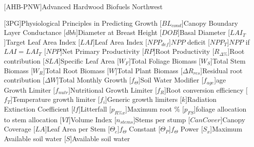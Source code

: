 \usepackage[printonlyused]{acronym}
[AHB-PNW]{Advanced Hardwood Biofuels Northwest}

[\textsc{3PG}]{Physiological Principles in Predicting Growth}
[\ensuremath{BL_{cond}}]{Canopy Boundary Layer Conductance}
[\ensuremath{dbh}]{Diameter at Breast Height}
[\ensuremath{DOB}]{Basal Diameter}
[\ensuremath{LAI_{T}}]{Target Leaf Area Index}
[\ensuremath{LAI}]{Leaf Area Index}
[\ensuremath{NPP_{def}}]{$NPP$ deficit}
[\ensuremath{NPP_{T}}]{$NPP$ if $LAI = LAI_{T}$}
[\ensuremath{NPP}]{Net Primary Productivity}
[\ensuremath{RP}]{Root Productivity}
[\ensuremath{R_{\Delta\%}}]{Root contribution}
[\ensuremath{SLA}]{Specific Leaf Area}
[\ensuremath{W_F}]{Total Foliage Biomass}
[\ensuremath{W_S}]{Total Stem Biomass}
[\ensuremath{W_R}]{Total Root Biomass}
[\ensuremath{W}]{Total Plant Biomass}
[\ensuremath{\Delta R_{res}}]{Residual root contribution}
[\ensuremath{\Delta W}]{Total Monthly Growth}
[\ensuremath{f_\Theta}]{Soil Water Modifier}
[\ensuremath{f_{age}}]{age Growth Limiter}
[\ensuremath{f_{nutr}}]{Nutritional Growth Limiter}
[\ensuremath{f_R}]{Root conversion efficiency}
[\ensuremath{f_T}]{Temperature growth limiter}
[\ensuremath{f_i}]{Generic growth limiters}
[\ensuremath{k}]{Radiation Extinction Coefficient}
[\ensuremath{lf}]{Litterfall}
[\ensuremath{p_{R\%x}}]{Maximum root \%}
[\ensuremath{p_{FS}}]{foliage allocation to stem allocation}
[\ensuremath{VI}]{Volume Index}
[\ensuremath{n_{stems}}]{Stems per stump}
[\ensuremath{CanCover}]{Canopy Coverage}
[\ensuremath{LA}]{Leaf Area per Stem}
[\ensuremath{\Theta_{c}}]{$f_\Theta$ Constant}
[\ensuremath{\Theta_{P}}]{$f_\Theta$ Power}
[\ensuremath{S_x}]{Maximum Available soil water}
[\ensuremath{S}]{Available soil water}


